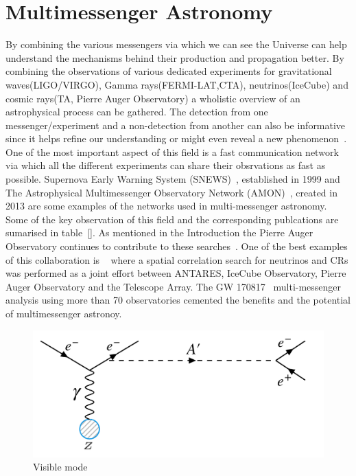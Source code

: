 \section{Multimessenger Astronomy}
  \label{sec:Mul-mes}
By combining the various messengers via which we can see the Universe can help understand the mechanisms behind their production and propagation better. By combining the observations of various dedicated experiments for gravitational waves(LIGO/VIRGO), Gamma rays(FERMI-LAT,CTA), neutrinos(IceCube) and cosmic rays(TA, Pierre Auger Observatory) a wholistic overview of an astrophysical process can be gathered. The detection from one messenger/experiment and a non-detection from another can also be informative since it helps refine our understanding or might even reveal a new phenomenon~\cite{}. One of the most important aspect of this field is a fast communication network via which all the different experiments can share their obsrvations as fast as possible. Supernova Early Warning System (SNEWS)~\cite{}, established in 1999 and The Astrophysical Multimessenger Observatory Network (AMON)~\cite{}, created in 2013 are some examples of the networks used in multi-messenger astronomy.  Some of the key observation of this field and the corresponding publcations are sumarised in table~\ref{}. As mentioned in the Introduction the Pierre Auger Observatory continues to contribute to these searches~\cite{}. One of the best examples of this collaboration is ~\cite{} where a spatial correlation search for neutrinos and CRs was performed as a joint effort between ANTARES, IceCube Observatory, Pierre Auger Observatory and the Telescope Array. The GW 170817~\cite{} multi-messenger analysis using more than 70 observatories cemented the benefits and the potential of multimessenger astronoy. 



\begin{figure}[t!]
\centering
\includegraphics[width=14.5cm]{thesis_figures/VISIBLE.png}
\caption{Visible mode }
\label{fig:Visible_feynman}
\end{figure}

